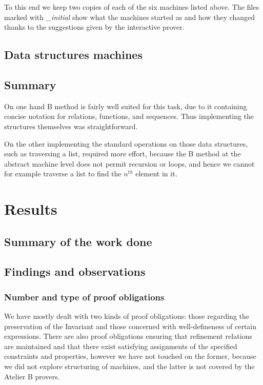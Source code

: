 \documentclass[11pt,journal]{IEEEtran}
\begin{document}
	To this end we keep two copies of each of the six machines listed above. The files marked with \emph{\_initial} show what the machines started as and how they changed thanks to the suggestions given by the interactive prover.
	
	\subsection{Data structures machines}
	
	\subsection{Summary}
	On one hand B method is fairly well suited for this task, due to it containing concise notation for relations, functions, and sequences. Thus implementing the structures themselves was straightforward. 
	
	On the other implementing the standard operations on those data structures, such as traversing a list, required more effort, because the B method at the abstract machine level does not permit recursion or loops, and hence we cannot for example traverse a list to find the $n^{th}$ element in it.


	\section{Results}
	\subsection{Summary of the work done}
	
	
	\subsection{Findings and observations}
	\subsubsection{Number and type of proof obligations}
	We have mostly dealt with two kinds of proof obligations: those regarding the preservation of the Invariant and those concerned with well-defineness of certain expressions. There are also proof obligations ensuring that refinement relations are maintained and that there exist satisfying assignments of the specified constraints and properties\cite{Sekerinski}, however we have not touched on the former, because we did not explore structuring of machines, and the latter is not covered by the Atelier B provers.
	
\end{document}
